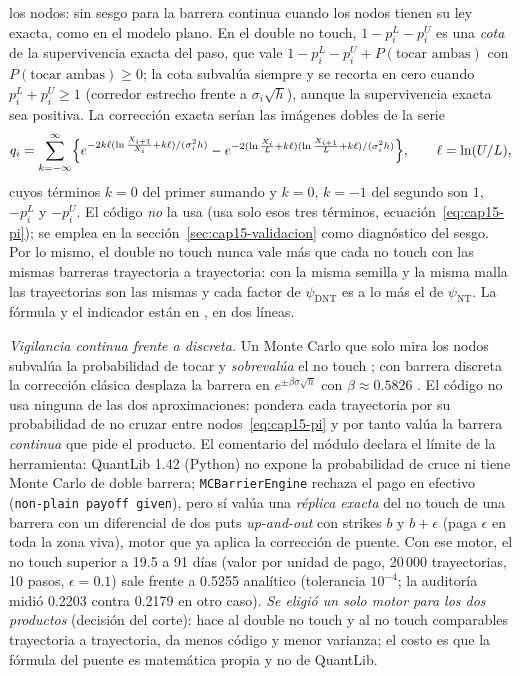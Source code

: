 los nodos: sin sesgo para la barrera continua cuando los nodos tienen su ley exacta, como en el modelo plano. En el double no
touch, $1-p_i^{L}-p_i^{U}$ es una \emph{cota} de la supervivencia exacta del paso, que vale $1-p_i^{L}-p_i^{U}+P(\text{tocar ambas})$ con
$P(\text{tocar ambas})\ge0$; la cota subvalúa siempre y se recorta en cero cuando $p_i^{L}+p_i^{U}\ge1$ (corredor estrecho frente a $\sigma_i\sqrt h$),
aunque la supervivencia exacta sea positiva. La corrección exacta serían las imágenes dobles de la serie
\begin{equation}\label{eq:cap15-puente-exacto}
  q_i=\sum_{k=-\infty}^{\infty}\Bigl\{e^{-2k\ell(\ln\frac{X_{i+1}}{X_i}+k\ell)/(\sigma_i^2h)}-e^{-2(\ln\frac{X_i}{L}+k\ell)(\ln\frac{X_{i+1}}{L}+k\ell)/(\sigma_i^2h)}\Bigr\},\qquad
  \ell=\ln(U/L),
\end{equation}
cuyos términos $k=0$ del primer sumando y $k=0$, $k=-1$ del segundo son $1$, $-p_i^{L}$ y $-p_i^{U}$. El código \emph{no} la usa (usa solo esos tres términos, ecuación~\eqref{eq:cap15-pi}); se
emplea en la sección~\ref{sec:cap15-validacion} como diagnóstico del sesgo. Por lo mismo, el double no touch nunca vale más que cada no touch con las
mismas barreras trayectoria a trayectoria: con la misma semilla y la misma malla las trayectorias son las mismas y cada factor de
$\psi_{\mathrm{DNT}}$ es a lo más el de $\psi_{\mathrm{NT}}$. La fórmula y el indicador están en , en
dos líneas.

\begin{diferencia}
  \emph{Vigilancia continua frente a discreta.} Un Monte Carlo que solo mira los nodos subvalúa la probabilidad de tocar y
  \emph{sobrevalúa} el no touch \citep{beaglehole1997}; con barrera discreta la corrección clásica desplaza la barrera en
  $e^{\pm\beta\sigma\sqrt h}$ con $\beta\approx0.5826$ \citep{broadie1997}. El código no usa ninguna de las dos aproximaciones: pondera cada trayectoria
  por su probabilidad de no cruzar entre nodos~\eqref{eq:cap15-pi} y por tanto valúa la barrera \emph{continua} que pide el producto. El
  comentario del módulo declara el límite de la herramienta: QuantLib 1.42 (Python) no expone la probabilidad de cruce ni tiene Monte
  Carlo de doble barrera; \texttt{MCBarrierEngine} rechaza el pago en efectivo (\texttt{non-plain payoff given}), pero sí valúa
  una \emph{réplica exacta} del no touch de una barrera con un diferencial de dos puts \emph{up-and-out} con strikes $b$ y $b+\epsilon$
  (paga $\epsilon$ en toda la zona viva), motor que ya aplica la corrección de puente. Con ese motor, el no touch superior a 19.5 a
  91 días (valor por unidad de pago, 20\,000 trayectorias, 10 pasos, $\epsilon=0.1$) sale  frente a 0.5255 analítico
  (tolerancia $10^{-4}$; la auditoría midió 0.2203 contra 0.2179 en otro caso). \emph{Se eligió un solo motor para los dos productos} (decisión del corte): hace al double no touch y al no
  touch comparables trayectoria a trayectoria, da menos código y menor varianza; el costo es que la fórmula del puente es matemática
  propia y no de QuantLib.
\end{diferencia}

